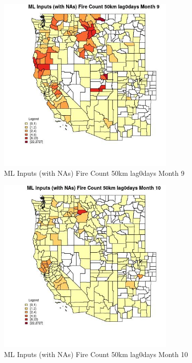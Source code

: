 \clearpage 

\begin{figure} 
\centering  
\includegraphics[width=0.77\textwidth]{Code_Outputs/Report_ML_input_PM25_Step4_part_f_de_duplicated_aves_prioritize_24hr_obswNAs_CountyFire_Count_50km_lag0daysmedianMonth9.jpg} 
\caption{\label{fig:Report_ML_input_PM25_Step4_part_f_de_duplicated_aves_prioritize_24hr_obswNAsCountyFire_Count_50km_lag0daysmedianMonth9}ML Inputs (with NAs) Fire Count 50km lag0days Month 9} 
\end{figure} 
 

\begin{figure} 
\centering  
\includegraphics[width=0.77\textwidth]{Code_Outputs/Report_ML_input_PM25_Step4_part_f_de_duplicated_aves_prioritize_24hr_obswNAs_CountyFire_Count_50km_lag0daysmedianMonth10.jpg} 
\caption{\label{fig:Report_ML_input_PM25_Step4_part_f_de_duplicated_aves_prioritize_24hr_obswNAsCountyFire_Count_50km_lag0daysmedianMonth10}ML Inputs (with NAs) Fire Count 50km lag0days Month 10} 
\end{figure} 
 

